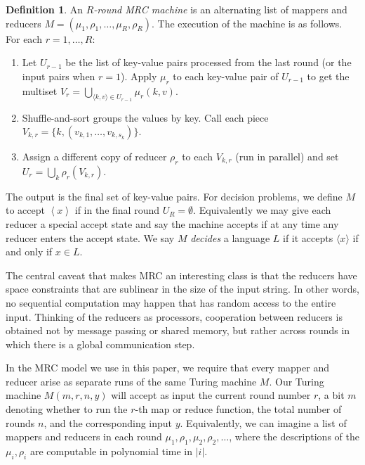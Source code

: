 \documentclass[11pt]{article}
\theoremstyle{definition}
\newtheorem{defn}{Definition}
\theoremstyle{remark}
\begin{document}
\begin{defn}
An \emph{$R$-round MRC machine} is an alternating list of mappers and reducers
$M = (\mu_1, \rho_1, \dots, \mu_R, \rho_R)$. The execution of the machine is as
follows.
For each $r = 1, \dots, R$:
\begin{enumerate}
  \item Let $U_{r-1}$ be the list of key-value pairs processed from the last
round (or the input pairs when $r=1$). Apply $\mu_r$ to each key-value pair of
$U_{r-1}$ to get the multiset $V_r = \bigcup_{\langle k,v \rangle \in U_{r-1}}
\mu_r(k, v).$

  \item Shuffle-and-sort groups the values by key. Call each piece $V_{k,r} =
\{ k, (v_{k,1}, \dots, v_{k,s_k})\}.$

  \item Assign a different copy of reducer $\rho_r$ to each $V_{k,r}$ (run in
parallel) and set $U_r = \bigcup_{k}\rho_r(V_{k,r})$.
\end{enumerate}
\end{defn}

The output is the final set of key-value pairs. For decision problems, we
define $M$ to accept $\left \langle x \right \rangle$ if in the final round
$U_R = \emptyset$. Equivalently we may give each reducer a special accept state
and say the machine accepts if at any time any reducer enters the accept state.
We say $M$ \emph{decides} a language $L$ if it accepts $\langle x \rangle$ if
and only if $x \in L$.

The central caveat that makes MRC an interesting class is that the reducers
have space constraints that are sublinear in the size of the input string. In
other words, no sequential computation may happen that has random access to the
entire input. Thinking of the reducers as processors, cooperation between
reducers is obtained not by message passing or shared memory, but rather across
rounds in which there is a global communication step.

In the MRC model we use in this paper, we require that every mapper and reducer
arise as separate runs of the same Turing machine $M$. Our Turing machine $M(m,
r, n, y)$ will accept as input the current round number $r$, a bit $m$ denoting
whether to run the $r$-th map or reduce function, the total number of rounds
$n$, and the corresponding input $y$.  Equivalently, we can imagine a list of
mappers and reducers in each round $\mu_1, \rho_1, \mu_2, \rho_2, \dots$, where
the descriptions of the $\mu_i, \rho_i$ are computable in
polynomial time in $|i|$. 
\end{document}
